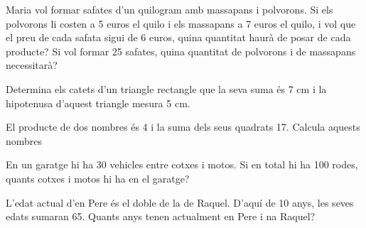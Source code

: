 \begin{activitats}
\begin{mylist}
\exer  Maria vol formar safates d'un quilogram amb massapans i polvorons. Si els polvorons li costen a 5 euros el quilo i els massapans a 7 euros el quilo, i vol que el preu de cada safata sigui de 6 euros, quina quantitat haurà de posar de cada producte? Si vol formar 25 safates, quina quantitat de polvorons i de massapans necessitarà?

\exer  Determina els catets d'un triangle rectangle que la seva suma és 7 cm i la hipotenusa d'aquest triangle mesura 5 cm.

\exer  El producte de dos nombres és 4 i la suma dels seus quadrats 17. Calcula aquests nombres


\exer  En un garatge hi ha 30 vehicles entre cotxes i motos. Si en total hi ha 100 rodes, quants cotxes i motos hi ha en el garatge?

\exer  L'edat actual d'en Pere és el doble de la de Raquel. D'aquí de 10 anys, les seves edats sumaran 65. Quants anys tenen actualment en Pere i na Raquel?


\end{mylist}
\end{activitats}
